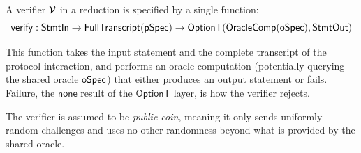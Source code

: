 \begin{definition}
    \label{def:verifier}
    A verifier \(\mathcal{V}\) in a reduction is specified by a single function:
    \begin{equation*} \mathsf{verify} : \mathsf{StmtIn} \to \mathsf{FullTranscript}(\mathsf{pSpec}) \to \mathsf{OptionT}(\mathsf{OracleComp}(\mathsf{oSpec}), \mathsf{StmtOut}) \end{equation*}

    This function takes the input statement and the complete transcript of the protocol interaction, and performs an oracle computation (potentially querying the shared oracle \(\mathsf{oSpec}\)) that either produces an output statement or fails. Failure, the \(\mathsf{none}\) result of the \(\mathsf{OptionT}\) layer, is how the verifier rejects.

    The verifier is assumed to be \emph{public-coin}, meaning it only sends uniformly random challenges and uses no other randomness beyond what is provided by the shared oracle.
    \leanok
\end{definition}

